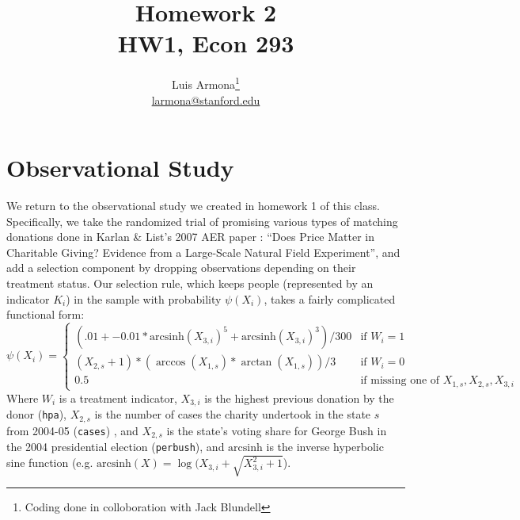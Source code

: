 \documentclass{article}
\begin{document}
\newcommand{\ihs}{\mathrm{arcsinh}}
\title{Homework 2 \\ HW1, Econ 293}
\author{Luis Armona\footnote{Coding done in colloboration with Jack Blundell} \\ \href{mailto:larmona@stanford.edu}{larmona@stanford.edu} }
\maketitle
\section{Observational Study}
We return to the observational study we created in homework 1 of this class. Specifically, we take the randomized trial of promising various types of matching donations done in Karlan \& List's 2007 AER paper : ``Does Price Matter in Charitable Giving? Evidence from a Large-Scale Natural Field Experiment'', and add a selection component by dropping observations depending on their treatment status. Our selection rule, which keeps people (represented by an indicator $K_i$) in the sample with probability $\psi(X_i)$, takes a fairly complicated functional form:
\[
  \psi(X_i)= \begin{cases}
  	  (.01 + -0.01*\ihs(X_{3,i})^5 + \ihs(X_{3,i})^3)/300 & \text{if $W_i=1$} \\
	  (X_{2,s}+1)*(\arccos(X_{1,s})*\arctan(X_{1,s}) )/3 & \text{if $W_i=0$} \\ 
     0.5 & \text{if missing one of $X_{1,s},X_{2,s},X_{3,i}$}
      \end{cases} 
\]
Where $W_i$ is a treatment indicator, $X_{3,i}$ is the highest previous donation by the donor (\texttt{hpa}), $X_{2,s}$ is the number of cases the charity undertook in the state $s$ from 2004-05 (\texttt{cases}) , and $X_{2,s}$ is the state's voting share for George Bush in the 2004 presidential election (\texttt{perbush}), and $\ihs$ is the inverse hyperbolic sine function (e.g. $\ihs(X) = \log(X_{3,i} + \sqrt{X_{3,i} ^ 2 + 1}$).
\end{document}
